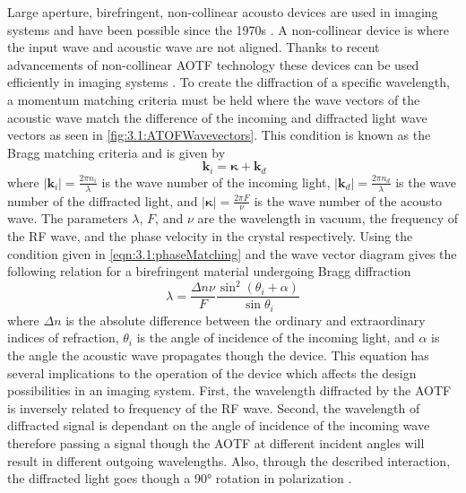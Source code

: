 \documentclass[12pt]{article}
\begin{document}
Large aperture, birefringent, non-collinear acousto devices are used in imaging systems and have been possible since the 1970s \citep{Chang1974}. A non-collinear device is where the input wave and acoustic wave are not aligned. Thanks to recent advancements of non-collinear AOTF technology these devices can be used efficiently in imaging systems \citep{Georgiev2002,Voloshinov2007}. To create the diffraction of a specific wavelength, a momentum matching criteria must be held where the wave vectors of the acoustic wave match the difference of the incoming and diffracted light wave vectors as seen in \autoref{fig:3.1:ATOFWavevectors}. This condition is known as the Bragg matching criteria and is given by
\begin{equation}
    \ \mathbf{k}_{i} = \boldsymbol\kappa + \mathbf{k}_{d}
    \label{eqn:3.1:phaseMatching}
\end{equation}
where $\left|\mathbf{k}_{i}\right| = \frac{2\pi n_{i}}{\lambda}$ is the wave number of the incoming light, $\left|\mathbf{k}_{d}\right| = \frac{2\pi n_{d}}{\lambda}$ is the wave number of the diffracted light, and $\left|\boldsymbol\kappa\right| = \frac{2\pi F}{\nu}$ is the wave number of the acousto wave. The parameters $\lambda$, $F$, and $\nu$ are the wavelength in vacuum, the frequency of the RF wave, and the phase velocity in the crystal respectively. Using the condition given in \autoref{eqn:3.1:phaseMatching} and the wave vector diagram gives the following relation for a birefringent material undergoing Bragg diffraction
\begin{equation}
    \lambda  = \frac{\Delta n\nu}{F}\frac{\sin^{2}(\theta_{i}+\alpha)}{\sin\theta_{i}}
    \label{eqn:3.1:AOTFWavelengthDependance}
\end{equation}
where $\Delta n$ is the absolute difference between the ordinary and extraordinary indices of refraction, $\theta_{i}$ is the angle of incidence of the incoming light, and $\alpha$ is the angle the acoustic wave propagates though the device. This equation has several implications to the operation of the device which affects the design possibilities in an imaging system. First, the wavelength diffracted by the AOTF is inversely related to frequency of the RF wave. Second, the wavelength of diffracted signal is dependant on the angle of incidence of the incoming wave therefore passing a signal though the AOTF at different incident angles will result in different outgoing wavelengths. Also, through the described interaction, the diffracted light goes though a 90\si{\degree} rotation in polarization \citep{Voloshinov1996}.
\end{document}
